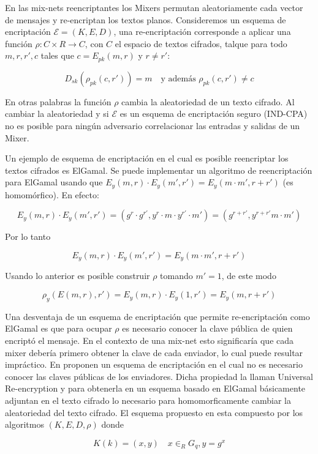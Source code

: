 En las mix-nets reencriptantes los Mixers permutan
aleatoriamente cada vector de mensajes y re-encriptan los textos planos.
Consideremos un esquema de encriptación $\mathcal{E} = (K, E, D)$,
una re-encriptación
corresponde a aplicar una función $\rho:C\times R\to C$, con $C$ el
espacio de textos cifrados, talque para todo $m, r, r', c$ tales que $c =  E_{pk}(m, r)$ y
$r \neq r'$:

$$D_{sk}(\rho_{pk}(c, r')) = m \quad \textrm{y además } \rho_{pk}(c, r') \neq c$$

En otras palabras la función $\rho$ cambia la aleatoriedad de un texto
cifrado.
Al cambiar la aleatoriedad y si  $\mathcal{E}$ es un esquema de encriptación seguro (IND-CPA)
no es posible para ningún adversario correlacionar las entradas y salidas de un Mixer.

Un ejemplo de esquema de encriptación en el cual es posible reencriptar
los textos cifrados es ElGamal. Se puede implementar un algoritmo de reencriptación para
ElGamal usando que $E_{y}(m,r)\cdot E_{y}(m',r') = E_{y}(m \cdot m',r+r')$ (es homomórfico). En efecto:

$$ E_{y}(m,r) \cdot
    E_{y}(m',r')
=
(g^{r} \cdot g^{r'},
 y^{r} \cdot m \cdot y^{r'} \cdot m')
=
(g^{r+r'},
 y^{r+r'}m \cdot m') $$

Por lo tanto

$$ E_{y}(m,r) \cdot E_{y}(m',r') = E_{y}(m \cdot m', r+r')$$


Usando lo anterior es posible construir $\rho$ tomando $m'=1$, de este
modo

$$\rho_{y}(E(m,r),r') = E_{y}(m,r) \cdot E_{y}(1,r') = E_{y}(m,r+r')$$

Una desventaja de un esquema de encriptación que permite re-encriptación
como ElGamal es que para ocupar $\rho$ es necesario conocer la clave pública
de quien encriptó el mensaje. En el contexto de una mix-net esto
significaría que cada mixer debería primero obtener la clave de cada
enviador, lo cual puede resultar impráctico.
En \cite{GolleEtAl04}
proponen un esquema de encriptación en el cual no es necesario conocer
las claves públicas de los enviadores. Dicha propiedad la llaman Universal
Re-encryption y para obtenerla en un esquema basado en ElGamal básicamente
adjuntan en el texto cifrado lo necesario para homomorficamente cambiar
la aleatoriedad del texto cifrado. El esquema propuesto en \cite{GolleEtAl04}
esta compuesto por los algoritmos $(K,E,D,\rho)$ donde

$$K(k)=(x,y)\quad x\in_{R} G_{q},  y=g^{x}$$


